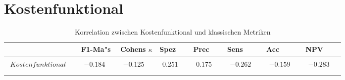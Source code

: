 \section{Kostenfunktional}
\begin{table}[!ht]
    \caption{Korrelation zwischen Kostenfunktional und klassischen Metriken}
	\centering
		\begin{tabular}{llllllll}
			\hline & F1-Ma"s& Cohens $\kappa$ & \gls{Spez} & \gls{Prec} & \gls{Sens}& \gls{Acc}& \gls{NPV}\\
			\hline {$\!\begin{aligned}
				&\\
				Kostenfunktional\\
				&\\
				\end{aligned}$} & {$\!\begin{aligned}
				&\\
			    -0.184\\
				&\\
				\end{aligned}$}& {$\!\begin{aligned}
				&\\
			    -0.125\\
				&\\
				\end{aligned}$}& {$\!\begin{aligned}
				&\\
			    0.251\\
				&\\
				\end{aligned}$}& {$\!\begin{aligned}
				&\\
			    0.175\\
				&\\
				\end{aligned}$}& {$\!\begin{aligned}
				&\\
			    -0.262\\
				&\\
				\end{aligned}$}& {$\!\begin{aligned}
				&\\
			    -0.159\\
				&\\
				\end{aligned}$}& {$\!\begin{aligned}
				&\\
			    -0.283\\
				&\\
				\end{aligned}$}\\
			    \hline
		\end{tabular}

\label{tab:KorrMetriken}
\end{table}


